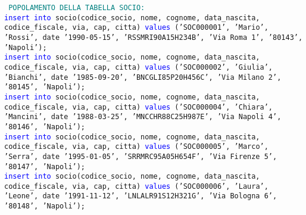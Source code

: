 \documentclass{article}
\begin{document}
    \newpage
    \begin{flushleft}
        \texttt{
        \textcolor{teal}{POPOLAMENTO DELLA TABELLA SOCIO:} \\
        \hspace*{0.5em}\textcolor{blue}{insert into} socio(codice\_socio, nome, cognome, data\_nascita, codice\_fiscale, via, \hspace*{0.5em}cap, citta) \textcolor{blue}{values} ('SOC000001', 'Mario', 'Rossi', date '1990-05-15', \hspace*{0.4em}'RSSMRI90A15H234B', 'Via Roma 1', '80143', 'Napoli'); \\
        \vspace{2mm}
        \hspace*{0.5em}\textcolor{blue}{insert into} socio(codice\_socio, nome, cognome, data\_nascita, codice\_fiscale, via, \hspace*{0.5em}cap, citta) \textcolor{blue}{values} ('SOC000002', 'Giulia', 'Bianchi', date '1985-09-20', \hspace*{0.4em}'BNCGLI85P20H456C', 'Via Milano 2', '80145', 'Napoli'); \\
        \vspace{2mm}
        \hspace*{0.5em}\textcolor{blue}{insert into} socio(codice\_socio, nome, cognome, data\_nascita, codice\_fiscale, via, \hspace*{0.5em}cap, citta) \textcolor{blue}{values} ('SOC000004', 'Chiara', 'Mancini', date '1988-03-25', \hspace*{0.4em}'MNCCHR88C25H987E', 'Via Napoli 4', '80146', 'Napoli'); \\
        \vspace{2mm}
        \hspace*{0.5em}\textcolor{blue}{insert into} socio(codice\_socio, nome, cognome, data\_nascita, codice\_fiscale, via, \hspace*{0.5em}cap, citta) \textcolor{blue}{values} ('SOC000005', 'Marco', 'Serra', date '1995-01-05', \hspace*{0.4em}'SRRMRC95A05H654F', 'Via Firenze 5', '80147', 'Napoli'); \\
        \vspace{2mm}
        \hspace*{0.5em}\textcolor{blue}{insert into} socio(codice\_socio, nome, cognome, data\_nascita, codice\_fiscale, via, \hspace*{0.5em}cap, citta) \textcolor{blue}{values} ('SOC000006', 'Laura', 'Leone', date '1991-11-12', \hspace*{0.4em}'LNLALR91S12H321G', 'Via Bologna 6', '80148', 'Napoli'); \\
}
\end{flushleft}
\end{document}

